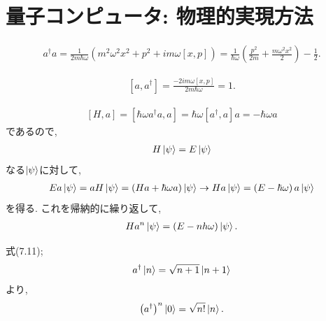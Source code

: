 \chapter{量子コンピュータ: 物理的実現方法}

\begin{ex}
    \label{ex7.1}
    \begin{align*}
        a^\dagger a
        =
        \frac{1}{2m\hbar \omega}
        \left( m^2 \omega^2 x^2 + p^2 + i m\omega \left[x,p\right] \right)
        =
        \frac{1}{\hbar \omega}
        \left(  \frac{p^2}{2m} + \frac{m \omega^2 x^2}{2} \right) - \frac{1}{2}.
    \end{align*}
\end{ex}

\begin{ex}
    \label{ex7.2}
    \begin{align*}
        \left[a, a^\dagger\right]
        =
        \frac{-2i m \omega \left[x,p\right] }{2m\hbar \omega}
        =
        1.
    \end{align*}
\end{ex}

\begin{ex}
    \label{ex7.3}
    \begin{align*}
        \left[H,a\right]
        = \left[ \hbar \omega a^\dagger a, a\right]
        = \hbar \omega [a^\dagger ,a]a
        = - \hbar \omega a
    \end{align*}
    であるので,
    \begin{align*}
        H \ket{\psi} = E \ket{\psi}
    \end{align*}
    なる$\ket{\psi}$に対して,
    \begin{align*}
        E a \ket{\psi} = aH \ket{\psi} = \left(Ha + \hbar \omega a \right) \ket{\psi}
        \to
        H a\ket{\psi} = \left(E - \hbar \omega \right) a \ket{\psi}
    \end{align*}
    を得る. これを帰納的に繰り返して,
    \begin{align*}
        H a^n \ket{\psi} = \left( E - nh\omega\right) \ket{\psi}.
    \end{align*}
\end{ex}

\begin{ex}
    \label{ex7.4}
    式(7.11);
    \begin{align*}
        a^\dagger \ket{n} = \sqrt{n+1} \ket{n+1}
    \end{align*}
    より,
    \begin{align*}
        \left(a^\dagger \right)^n \ket{0} = \sqrt{n!} \ket{n}.
    \end{align*}
\end{ex}

